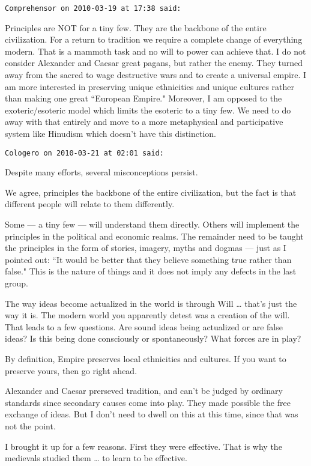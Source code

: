 \begin{footnotesize}
\begin{sffamily}
\hfill

\texttt{Comprehensor on 2010-03-19 at 17:38 said: }

Principles are NOT for a tiny few. They are the backbone of the entire civilization. For a return to tradition we require a complete change of everything modern. That is a mammoth task and no will to power can achieve that. I do not consider Alexander and Caesar great pagans, but rather the enemy. They turned away from the sacred to wage destructive wars and to create a universal empire. I am more interested in preserving unique ethnicities and unique cultures rather than making one great ``European Empire." Moreover, I am opposed to the exoteric/esoteric model which limits the esoteric to a tiny few. We need to do away with that entirely and move to a more metaphysical and participative system like Hinudism which doesn't have this distinction.


\hfill

\texttt{Cologero on 2010-03-21 at 02:01 said: }

Despite many efforts, several misconceptions persist.

We agree, principles the backbone of the entire civilization, but the fact is that different people will relate to them differently.

Some — a tiny few — will understand them directly. Others will implement the principles in the political and economic realms. The remainder need to be taught the principles in the form of stories, imagery, myths and dogmas — just as I pointed out: ``It would be better that they believe something true rather than false." This is the nature of things and it does not imply any defects in the last group.

The way ideas become actualized in the world is through Will … that's just the way it is. The modern world you apparently detest was a creation of the will. That leads to a few questions. Are sound ideas being actualized or are false ideas? Is this being done consciously or spontaneously? What forces are in play?

By definition, Empire preserves local ethnicities and cultures. If you want to preserve yours, then go right ahead.

Alexander and Caesar prerseved tradition, and can't be judged by ordinary standards since secondary causes come into play. They made possible the free exchange of ideas. But I don't need to dwell on this at this time, since that was not the point.

I brought it up for a few reasons. First they were effective. That is why the medievals studied them … to learn to be effective.


\end{sffamily}
\end{footnotesize}

